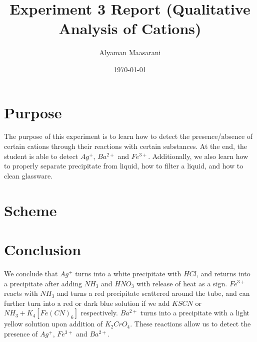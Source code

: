 \documentclass[11pt]{article}
\author{Alyaman Maasarani}
\date{\today}
\title{Experiment 3 Report (Qualitative Analysis of Cations)}
\begin{document}
\maketitle
\tableofcontents


\section{Purpose}
\label{sec:org33dd161}
The purpose of this experiment is to learn how to detect the presence/absence of certain cations through their reactions with certain substances. At the end, the student is able to detect \(Ag^{+}\), \(Ba^{2+}\) and \(Fe^{3+}\). Additionally, we also learn how to properly separate precipitate from liquid, how to filter a liquid, and how to clean glassware.

\section{Scheme}
\label{sec:org9afc1ef}
\begin{center}
  \makebox[0pt]{\scalebox{0.85}{}}
\end{center}

\section{Conclusion}
\label{sec:orgf90cc25}
We conclude that \(Ag^+\) turns into a white precipitate with \(HCl\), and returns into a precipitate after adding \(NH_3\) and \(HNO_3\) with release of heat as a sign. \(Fe^{3+}\) reacts with \(NH_3\) and turns a red precipitate scattered around the tube, and can further turn into a red or dark blue solution if we add \(KSCN\) or \(NH_3 + K_4[Fe(CN)_6]\) respectively. \(Ba^{2+}\) turns into a precipitate with a light yellow solution upon addition of \(K_2CrO_4\). These reactions allow us to detect the presence of \(Ag^+\), \(Fe^{3+}\) and \(Ba^{2+}\).
\end{document}
